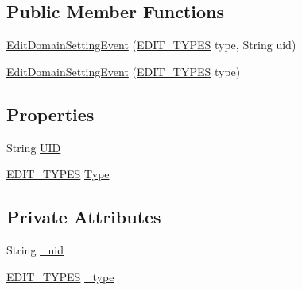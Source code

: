 \subsection*{Public Member Functions}
\begin{DoxyCompactItemize}
\item 
\hyperlink{class_web_analyzer_1_1_events_1_1_edit_domain_setting_event_ad3da8a162d7b3cb9e02b350d79f6d2b8}{Edit\+Domain\+Setting\+Event} (\hyperlink{class_web_analyzer_1_1_events_1_1_edit_domain_setting_event_a1a22be020f4b06370ab3a64893272b44}{E\+D\+I\+T\+\_\+\+T\+Y\+P\+E\+S} type, String uid)
\item 
\hyperlink{class_web_analyzer_1_1_events_1_1_edit_domain_setting_event_a5b19e6d92e7d9281cb57461d6451c24c}{Edit\+Domain\+Setting\+Event} (\hyperlink{class_web_analyzer_1_1_events_1_1_edit_domain_setting_event_a1a22be020f4b06370ab3a64893272b44}{E\+D\+I\+T\+\_\+\+T\+Y\+P\+E\+S} type)
\end{DoxyCompactItemize}
\subsection*{Properties}
\begin{DoxyCompactItemize}
\item 
String \hyperlink{class_web_analyzer_1_1_events_1_1_edit_domain_setting_event_ad1c58d61b04b924664078c684161f861}{U\+I\+D}
\item 
\hyperlink{class_web_analyzer_1_1_events_1_1_edit_domain_setting_event_a1a22be020f4b06370ab3a64893272b44}{E\+D\+I\+T\+\_\+\+T\+Y\+P\+E\+S} \hyperlink{class_web_analyzer_1_1_events_1_1_edit_domain_setting_event_a36f36d7fa2adf9fb69c62c4dbdcf034e}{Type}
\end{DoxyCompactItemize}
\subsection*{Private Attributes}
\begin{DoxyCompactItemize}
\item 
String \hyperlink{class_web_analyzer_1_1_events_1_1_edit_domain_setting_event_aa086a99df55cd981e1d841edb844ebcc}{\+\_\+uid}
\item 
\hyperlink{class_web_analyzer_1_1_events_1_1_edit_domain_setting_event_a1a22be020f4b06370ab3a64893272b44}{E\+D\+I\+T\+\_\+\+T\+Y\+P\+E\+S} \hyperlink{class_web_analyzer_1_1_events_1_1_edit_domain_setting_event_afe924ff1d33b89646a5e3de2110a0f14}{\+\_\+type}
\end{DoxyCompactItemize}


